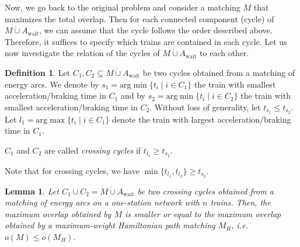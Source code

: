 \documentclass[11pt,a4paper]{article}
\newcommand{\dotcup}{\mathbin{\dot\cup}}
\newcommand{\wait}{\mathrm{wait}}
\newcommand{\energyact}{M}               %
\newtheorem{lemma}[theorem]{Lemma}
\theoremstyle{definition}
\newtheorem{definition}[theorem]{Definition}
\theoremstyle{remark}
\begin{document}
Now, we go back to the original problem and consider a matching $\energyact$ that maximizes the total overlap. Then for each connected component (cycle) of $\energyact \dotcup A_{\wait}$, we can assume that the cycle follows the order described above. Therefore, it suffices to specify which trains are contained in each cycle.
Let us now investigate the relation of the cycles of $\energyact \dotcup A_{\wait}$ to each other.


\begin{definition}
	Let $C_1, C_2 \subseteq \energyact\dotcup A_{\wait}$ be two cycles obtained from a matching of energy arcs. We denote by $s_1 = \text{arg}\min \{t_i \mid i \in C_1 \}$ the train with smallest acceleration/braking time in $C_1$ and by $s_2 = \text{arg}\min \{t_i \mid i \in C_2 \}$ the train with smallest acceleration/braking time in $C_2$. Without loss of generality, let $t_{s_1} \leq t_{s_2}$. Let $l_1 = \text{arg}\max \{t_i \mid i \in C_1 \}$ denote the train with largest acceleration/braking time in $C_1$. 
	
	$C_1$ and $C_2$ are called \textit{crossing cycles} if $t_{l_1} \geq t_{s_2}$.
\end{definition}

Note that for crossing cycles, we have $\min\{t_{l_1}, t_{l_2}\} \ge t_{s_2}$.

\begin{lemma}\label{lem:crossing}
	Let $C_1 \cup C_2 = \energyact\dotcup A_{\wait}$ be two crossing cycles obtained from a matching of energy arcs on a one-station network with $n$ trains. Then, the maximum overlap obtained by $\energyact$ is smaller or equal to the maximum overlap obtained by a maximum-weight Hamiltonian path matching $\energyact_H$, i.e. $o(\energyact) \leq o(\energyact_H)$.
\end{lemma}
\end{document}
